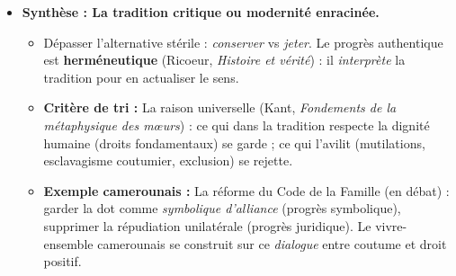 \documentclass[11pt]{article}
\newcommand{\cle}[1]{{\popxbold\color{popdark}#1}}
\begin{document}
\begin{exoresolu}
\begin{itemize}
\begin{itemize}
            \item \textbf{Argument 3 :} La tradition n'est pas figée : elle est \cle{invention permanente} (Hobsbawm/Ranger, \emph{L'Invention de la tradition}). La \cle{palabre} africaine évolue : elle intègre aujourd'hui les droits de l'homme et la gestion des conflits fonciers modernes.
        \end{itemize}
        \item \textbf{Synthèse : La \cle{tradition critique} ou \cle{modernité enracinée}.}
        \begin{itemize}
            \item Dépasser l'alternative stérile : \emph{conserver} vs \emph{jeter}. Le progrès authentique est \textbf{herméneutique} (Ricoeur, \emph{Histoire et vérité}) : il \emph{interprète} la tradition pour en actualiser le sens.
            \item \textbf{Critère de tri :} La \cle{raison universelle} (Kant, \emph{Fondements de la métaphysique des mœurs}) : ce qui dans la tradition respecte la \cle{dignité humaine} (droits fondamentaux) se garde ; ce qui l'avilit (mutilations, esclavagisme coutumier, exclusion) se rejette.
            \item \textbf{Exemple camerounais :} La réforme du Code de la Famille (en débat) : garder la dot comme \emph{symbolique d'alliance} (progrès symbolique), supprimer la répudiation unilatérale (progrès juridique). Le \cle{vivre-ensemble} camerounais se construit sur ce \emph{dialogue} entre coutume et droit positif.
        \end{itemize}
    \end{itemize}


\end{exoresolu}
\end{document}

